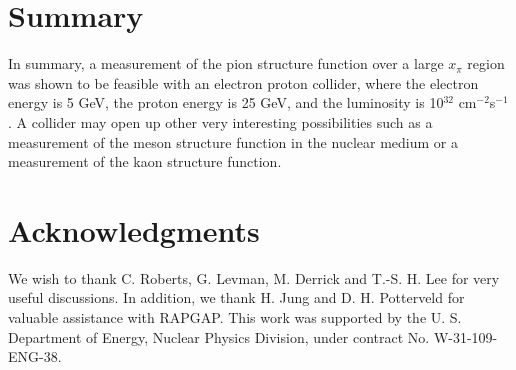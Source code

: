 \section*{Summary}

In summary, a measurement of the pion structure function over a large
$x_\pi$ region was shown to be feasible with an electron proton
collider, where the electron energy is 5 GeV, the proton energy is 25
GeV, and the luminosity is 10$^{32}$ cm$^{-2}$s$^{-1}$.  A collider
may open up other very interesting possibilities such as a measurement
of the meson structure function in the nuclear medium or a measurement
of the kaon structure function.

\section*{Acknowledgments}

We wish to thank C. Roberts, G. Levman, M. Derrick and T.-S. H. Lee
for very useful discussions.  In addition, we thank H. Jung and
D. H. Potterveld for valuable assistance with RAPGAP.  This work was
supported by the U. S. Department of Energy, Nuclear Physics Division,
under contract No. W-31-109-ENG-38.

